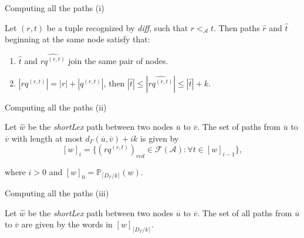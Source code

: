 \begin{frame}{Computing all the paths (i)}

Let $(r,t)$ be a tuple recognized by \textit{diff}, such that $r<_\mathcal{A}t$. Then paths $\widehat{r}$ and $\widehat{t}$ beginning at the same node satisfy that:
\begin{enumerate}
    \item $\widehat{t}$ and $\widehat{rq^{(r,t)}}$ join the same pair of nodes.
    \item  $|rq^{(r,t)}| = |r|+|q^{(r,t)}|$, then $|\widehat{t}|\leq|\widehat{rq^{(r,t)}}| \leq |\widehat{t}|+k$.
\end{enumerate}
\end{frame}

\begin{frame}{Computing all the paths (ii)}

\begin{lemma}
Let $\widehat{w}$ be the \textit{shortLex} path between two nodes $\overline{u}$ to $\overline{v}$. The set of paths from $\overline{u}$ to $\overline{v}$ with length at most $d_\Gamma(\overline{u},\overline{v})+ik$ is given by
$$[w]_i =\{(rq^{(r,t)})_{red}\in \mathcal{F}(\mathcal{A}):\forall t \in [w]_{i-1}\},$$

where $i>0$ and $[w]_0=\mathbb{P}_{\lceil D_\Gamma / k\rceil}(w)$.
\end{lemma}

\end{frame}

\begin{frame}{Computing all the paths (iii)}

\begin{corollary}
Let $\widehat{w}$ be the \textit{shortLex} path between two nodes $\overline{u}$ to $\overline{v}$. The set of all paths from $\overline{u}$ to $\overline{v}$ are given by the words in $[w]_{\lceil D_\Gamma / k\rceil}$.
\end{corollary}

\end{frame}